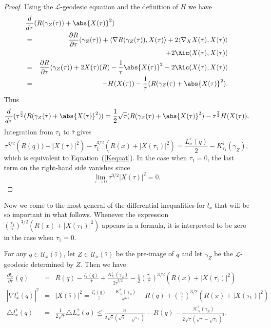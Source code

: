 \begin{proof}
Using the ${\mathcal L}$-geodesic equation and the definition of $H$ we have
\begin{eqnarray*}
\lefteqn{\frac{d}{d\tau}(R(\gamma_Z(\tau))+ \abs{X(\tau)}^{2})} \\ &
= & \frac{\partial R}{\partial\tau}(\gamma_Z(\tau)) + \langle \nabla
R(\gamma_Z(\tau)),
X(\tau)\rangle + 2\langle \nabla_{X}X(\tau),X(\tau)\rangle \\
& & + 2\Ric(X(\tau),X(\tau))
\\&= & \frac{\partial R}{\partial\tau}(\gamma_Z(\tau)) + 2X(\tau)(R) - \frac{1}{\tau}\abs{X(\tau)}^{2} -
2\Ric(X(\tau),X(\tau)) \\&= &-H(X(\tau))
-\frac{1}{\tau}(R(\gamma_Z(\tau)+ \abs{X(\tau)}^{2}).
\end{eqnarray*}
Thus
$$\frac{d}{d\tau}(\tau^{\frac{3}{2}}(R(\gamma_Z(\tau)+\abs{X(\tau)}^{2}) )=
\frac{1}{2}\sqrt{\tau}(R(\gamma_Z(\tau)+\abs{X(\tau)}^{2}) -
\tau^{\frac{3}{2}}H(X(\tau)).$$ Integration from $\tau_1$ to $\bar\tau$ gives
$$\bar\tau^{3/2}\left(R(q))+|X(\bar\tau)|^2\right)-\tau_1^{3/2}(R(x)+|X(\tau_1)|^2)
=\frac{L_x^{\bar\tau}(q)}{2}-K_{\tau_1}^{\bar\tau}(\gamma_Z),$$
which is equivalent to Equation~(\ref{Kequat}). In the case when
$\tau_1=0$, the last term on the right-hand side vanishes since
$$\lim_{\tau\rightarrow 0}\tau^{3/2}|X(\tau)|^2=0.$$
\end{proof}



Now we come to the most general of the differential inequalities for
$l_x$ that will be so important in what follows. Whenever the
expression
$\left(\frac{\tau_1}{\bar\tau}\right)^{3/2}\left(R(x)+|X(\tau_1)|^2\right)$
appears in a formula, it is interpreted to be zero in the case when
$\tau_1=0$.


\begin{lemma}\label{lem:reduced-length-differential-inequalities}
\label{linequal}
For any  $q\in{\mathcal U}_x(\bar\tau)$, let $Z\in
\widetilde{\mathcal U}_x(\bar\tau)$ be the pre-image of $q$ and let
$\gamma_Z$ be the ${\mathcal L}$-geodesic determined by $Z$. Then we
have
\begin{eqnarray*} \frac{\partial l_x}{\partial \tau}(q) & = &
R(q)-\frac{l_x(q)}{\bar\tau}+\frac{K_{\tau_1}^{\bar\tau}(\gamma_Z)}{2\bar\tau^{3/2}}-\frac{1}{2}\left(\frac{\tau_1}{\bar\tau}
\right)^{3/2}\left(R(x)+|X(\tau_1)|^2\right) \\
|\nabla l^{\bar\tau}_x(q)|^2 & = & |X(\bar\tau)|^2
=\frac{l^{\bar\tau}_x(q)}{\bar\tau}-\frac{K_{\tau_1}^{\bar\tau}
(\gamma_Z)}{\bar\tau^{3/2}}-R(q) +\left(\frac{\tau_1}{\bar\tau}
\right)^{3/2}\left(R(x)+|X(\tau_1)|^2\right) \\
\triangle l^{\bar\tau}_x(q) & = & \frac{1}{2\sqrt{\bar\tau}}\triangle
L^{\bar\tau}_x(q)\le \frac{n}{2\sqrt{\bar\tau}(\sqrt{\bar\tau}-\sqrt{\tau_1})}
-R(q)-\frac{{\mathcal
K}_{\tau_1}^{\bar\tau}(\gamma_Z)}{2\sqrt{\bar\tau}(\sqrt{\bar\tau}-\sqrt{\tau_1})^{2}}.
\end{eqnarray*}
\end{lemma}

